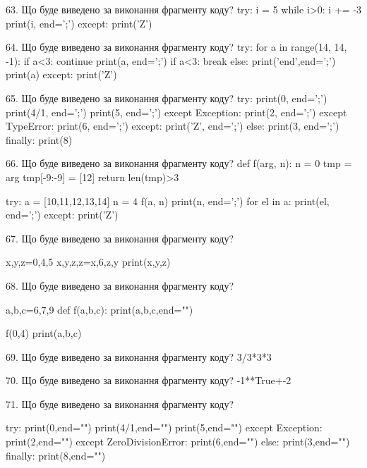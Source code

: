 \documentclass[11pt]{article}
\begin{document}

63. Що буде виведено за виконання фрагменту коду?
try:
    i = 5
    while i>0:
        i += -3
    print(i, end=';')
except:
    print('Z')


64. Що буде виведено за виконання фрагменту коду?
try:
    for a in range(14, 14, -1):
        if a<3:
            continue
        print(a, end=';')
        if a<3:
            break
    else:
        print('end',end=';')
    print(a)
except:
    print('Z')


65. Що буде виведено за виконання фрагменту коду?
try:
    print(0, end=';')
    print(4/1, end=';')
    print(5, end=';')
except Exception:
    print(2, end=';')
except TypeError:
    print(6, end=';')
except:
    print('Z', end=';')
else:
    print(3, end=';')
finally:
    print(8)


66. Що буде виведено за виконання фрагменту коду?
def f(arg, n):
    n = 0
    tmp = arg
    tmp[-9:-9] = [12]
    return len(tmp)>3

try:
    a = [10,11,12,13,14]
    n = 4
    f(a, n)
    print(n, end=';')
    for el in a:
        print(el, end=';')
except:
    print('Z')


67. Що буде виведено за виконання фрагменту коду?

x,y,z=0,4,5
x,y,z,z=x,6,z,y
print(x,y,z)


68. Що буде виведено за виконання фрагменту коду?

a,b,c=6,7,9
def f(a,b,c):
    print(a,b,c,end="")

f(0,4)
print(a,b,c)



69. Що буде виведено за виконання фрагменту коду?
3/3*3*3

70. Що буде виведено за виконання фрагменту коду?
-1**True+-2

71. Що буде виведено за виконання фрагменту коду?

try:
    print(0,end="")
    print(4/1,end="")
    print(5,end="")
except Exception: print(2,end="")
except ZeroDivisionError: print(6,end="")
else: print(3,end="")
finally: print(8,end="")

\end{document}
